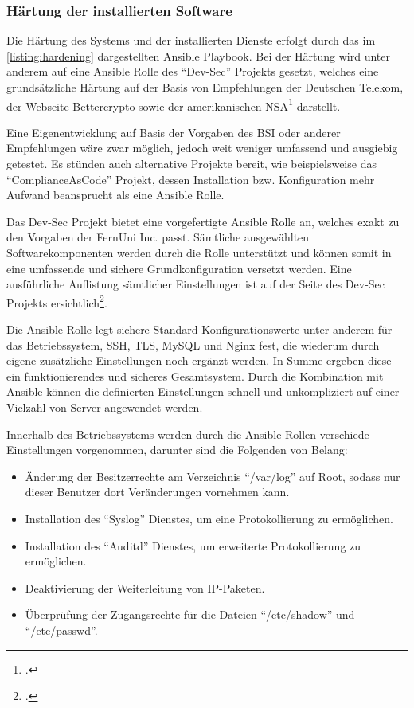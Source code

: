 \subsubsection{Härtung der installierten Software}

Die Härtung des Systems und der installierten Dienste erfolgt durch das im \autoref{listing:hardening} dargestellten Ansible Playbook. Bei der Härtung wird unter anderem auf eine Ansible Rolle des \enquote{Dev-Sec} Projekts gesetzt, welches eine grundsätzliche Härtung auf der Basis von Empfehlungen der Deutschen Telekom, der Webseite \href{https://bettercrypto.org/}{Bettercrypto} sowie der amerikanischen \ac{NSA}\footcite[Vgl.][]{OverviewDevSecBaselines} darstellt. 

Eine Eigenentwicklung auf Basis der Vorgaben des \ac{BSI} oder anderer Empfehlungen wäre zwar möglich, jedoch weit weniger umfassend und ausgiebig getestet. Es stünden auch alternative Projekte bereit, wie beispielsweise das \enquote{ComplianceAsCode} Projekt, dessen Installation bzw. Konfiguration mehr Aufwand beansprucht als eine Ansible Rolle.

Das Dev-Sec Projekt bietet eine vorgefertigte Ansible Rolle an, welches exakt zu den Vorgaben der FernUni Inc. passt. Sämtliche ausgewählten Softwarekomponenten werden durch die Rolle unterstützt und können somit in eine umfassende und sichere Grundkonfiguration versetzt werden. 
Eine ausführliche Auflistung sämtlicher Einstellungen ist auf der Seite des Dev-Sec Projekts ersichtlich\footcite[Vgl.][]{OverviewDevSecBaselines}.

Die Ansible Rolle legt sichere Standard-Konfigurationswerte unter anderem für das Betriebssystem, \ac{SSH}, \ac{TLS}, MySQL und Nginx fest, die wiederum durch eigene zusätzliche Einstellungen noch ergänzt werden. In Summe ergeben diese ein funktionierendes und sicheres Gesamtsystem. Durch die Kombination mit Ansible können die definierten Einstellungen schnell und unkompliziert auf einer Vielzahl von Server angewendet werden.

Innerhalb des Betriebssystems werden durch die Ansible Rollen verschiede Einstellungen vorgenommen, darunter sind die Folgenden von Belang:

\begin{itemize}
	\item Änderung der Besitzerrechte am Verzeichnis \enquote{/var/log} auf Root, sodass nur dieser Benutzer dort Veränderungen vornehmen kann.
	\item Installation des \enquote{Syslog} Dienstes, um eine Protokollierung zu ermöglichen.
	\item Installation des \enquote{Auditd} Dienstes, um erweiterte Protokollierung zu ermöglichen.
	\item Deaktivierung der Weiterleitung von \ac{IP}-Paketen.
	\item Überprüfung der Zugangsrechte für die Dateien \enquote{/etc/shadow} und \enquote{/etc/passwd}.
\end{itemize}

